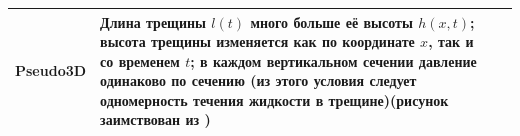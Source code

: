 \begin{longtable}[l]{|L{2.2cm}|m{7.3cm}|L{6.2cm}|}
	Pseudo3D&Длина трещины $l(t)$ много больше её высоты $h(x,t)$; высота трещины изменяется как по координате $x$, так и со временем $t$; в каждом вертикальном сечении давление одинаково по сечению (из этого условия следует одномерность течения жидкости в трещине)\break\hfill\break (рисунок заимствован из \cite{dontsov_peirce,baykin_course})&\hfill\break{}\hfill\break\\ \hline

\end{longtable}

